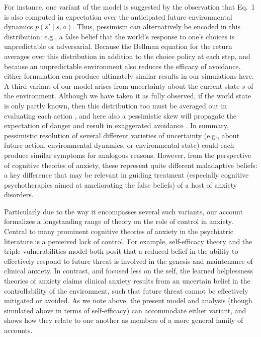\documentclass[11pt]{article} %
\begin{document}
For instance, one variant of the model is suggested by the observation that Eq.~1 is also computed in expectation over the anticipated future environmental dynamics $p(s' \mid s,a)$. Thus, pessimism can alternatively be encoded in this distribution: e.g., a false belief that the world's response to one's choices is unpredictable or adversarial. Because the Bellman equation for the return averages over this distribution in addition to the choice policy at each step, and because an unpredictable environment also reduces the efficacy of avoidance, either formulation can produce ultimately similar results in our simulations here. A third variant of our model arises from uncertainty about the current state $s$ of the environment. Although we have taken it as fully observed, if the world state is only partly known, then this distribution too must be averaged out in evaluating each action \citep{kaelbling1998}, and here also a pessimistic skew will propagate the expectation of danger and result in exaggerated avoidance \citep{Paulus2012}. In summary, pessimistic resolution of several different varieties of uncertainty (e.g., about future action, environmental dynamics, or environmental state) could each produce similar symptoms for analogous reasons. However, from the perspective of cognitive theories of anxiety, these represent quite different maladaptive beliefs: a key difference that may be relevant in guiding treatment (especially cognitive psychotherapies aimed at ameliorating the false beliefs) of a host of anxiety disorders.

Particularly due to the way it encompasses several such variants, our account formalizes a longstanding range of theory on the role of control in anxiety. Central to many prominent cognitive theories of anxiety in the psychiatric literature is a perceived lack of control. For example, self-efficacy theory \citep{bandura1977} and the triple vulnerabilities model \citep{barlow2002} both posit that a reduced belief in the ability to effectively respond to future threat is involved in the genesis and maintenance of clinical anxiety. In contrast, and focused less on the self, the learned helplessness theories of anxiety \cite{alloy1990} claims clinical anxiety results from an uncertain belief in the controllability of the environment, such that future threat cannot be effectively mitigated or avoided. As we note above, the present model and analysis (though simulated above in terms of self-efficacy) can accommodate either variant, and shows how they relate to one another as members of a more general family of accounts. 
\end{document}
